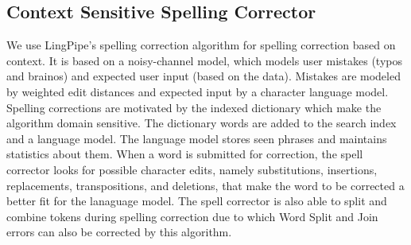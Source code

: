 \documentclass[preprint,11pt]{elsarticle}
\begin{document}
\subsection{Context Sensitive Spelling Corrector}
We use LingPipe's spelling correction algorithm for spelling correction based on context. It is based on a noisy-channel model, which models user mistakes (typos and brainos) and expected user input (based on the data). Mistakes are modeled by weighted edit distances and expected input by a character language model.
Spelling corrections are motivated by the indexed dictionary which make the algorithm domain sensitive.  The dictionary words are added to the search index and a language model. The language model stores seen phrases and maintains statistics about them. When a word is submitted for correction, the spell corrector looks for possible character edits, namely substitutions, insertions, replacements, transpositions, and deletions, that make the word to be corrected a better fit for the lanaguage model. The spell corrector is also able to split and combine tokens during spelling correction due to which Word Split and Join errors can also be corrected by this algorithm.
\end{document}
